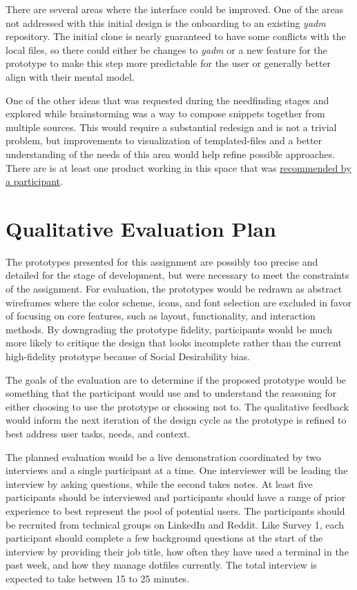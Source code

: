 \documentclass[letterpaper]{jdf}
\begin{document}
 There are several areas where the interface could be improved. One of the areas not addressed with this initial design is the onboarding to an existing \emph{yadm} repository. The initial clone is nearly guaranteed to have some conflicts with the local files, so there could either be changes to \emph{yadm} or a new feature for the prototype to make this step more predictable for the user or generally better align with their mental model.

 One of the other ideas that was requested during the needfinding stages and explored while brainstorming was a way to compose snippets together from multiple sources. This would require a substantial redesign and is not a trivial problem, but improvements to visualization of templated-files and a better understanding of the needs of this area would help refine possible approaches. There are is at least one product working in this space that was \href{https://github.com/callrbx/meld}{recommended by a participant}.

\section{Qualitative Evaluation Plan}

 The prototypes presented for this assignment are possibly too precise and detailed for the stage of development, but were necessary to meet the constraints of the assignment. For evaluation, the prototypes would be redrawn as abstract wireframes where the color scheme, icons, and font selection are excluded in favor of focusing on core features, such as layout, functionality, and interaction methods. By downgrading the prototype fidelity, participants would be much more likely to critique the design that looks incomplete rather than the current high-fidelity prototype because of Social Desirability bias.

 The goals of the evaluation are to determine if the proposed prototype would be something that the participant would use and to understand the reasoning for either choosing to use the prototype or choosing not to. The qualitative feedback would inform the next iteration of the design cycle as the prototype is refined to best address user tasks, needs, and context.

 The planned evaluation would be a live demonstration coordinated by two interviews and a single participant at a time. One interviewer will be leading the interview by asking questions, while the second takes notes. At least five participants should be interviewed and participants should have a range of prior experience to best represent the pool of potential users. The participants should be recruited from technical groups on LinkedIn and Reddit. Like Survey 1, each participant should complete a few background questions at the start of the interview by providing their job title, how often they have used a terminal in the past week, and how they manage dotfiles currently. The total interview is expected to take between 15 to 25 minutes.
\end{document}
